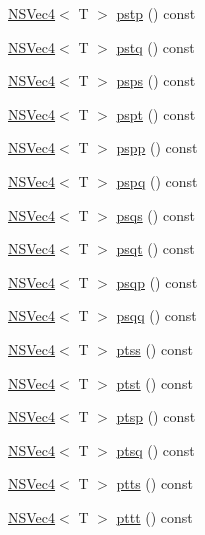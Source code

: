 \begin{DoxyCompactItemize}
\item 
\hyperlink{structNSVec4}{N\-S\-Vec4}$<$ T $>$ \hyperlink{structNSVec4_a2698a980bdd0f51541b2cf7fc70bcf73}{pstp} () const 
\item 
\hyperlink{structNSVec4}{N\-S\-Vec4}$<$ T $>$ \hyperlink{structNSVec4_a14bdfbfd269ca6f0bf85a7398a642324}{pstq} () const 
\item 
\hyperlink{structNSVec4}{N\-S\-Vec4}$<$ T $>$ \hyperlink{structNSVec4_add19de549cf8817c34ceac277e2e99ba}{psps} () const 
\item 
\hyperlink{structNSVec4}{N\-S\-Vec4}$<$ T $>$ \hyperlink{structNSVec4_af130d4783f5a2f97c95e58bdf30d685a}{pspt} () const 
\item 
\hyperlink{structNSVec4}{N\-S\-Vec4}$<$ T $>$ \hyperlink{structNSVec4_a39f177944247302e4107e51a2d885dda}{pspp} () const 
\item 
\hyperlink{structNSVec4}{N\-S\-Vec4}$<$ T $>$ \hyperlink{structNSVec4_a06bca7d4b0a3b90faffebdce43de3885}{pspq} () const 
\item 
\hyperlink{structNSVec4}{N\-S\-Vec4}$<$ T $>$ \hyperlink{structNSVec4_a3cb9d27366faf0e9e0325af8d4db5b0b}{psqs} () const 
\item 
\hyperlink{structNSVec4}{N\-S\-Vec4}$<$ T $>$ \hyperlink{structNSVec4_a8b303606e2937031e0bdfcfc5da4b752}{psqt} () const 
\item 
\hyperlink{structNSVec4}{N\-S\-Vec4}$<$ T $>$ \hyperlink{structNSVec4_aef09c71cec9777be13b3c1a3dd3e1448}{psqp} () const 
\item 
\hyperlink{structNSVec4}{N\-S\-Vec4}$<$ T $>$ \hyperlink{structNSVec4_a799c245268fa780b48a77eecf05656bb}{psqq} () const 
\item 
\hyperlink{structNSVec4}{N\-S\-Vec4}$<$ T $>$ \hyperlink{structNSVec4_a50448e8f167ea9d665618c501828316c}{ptss} () const 
\item 
\hyperlink{structNSVec4}{N\-S\-Vec4}$<$ T $>$ \hyperlink{structNSVec4_a4a3bb20ad6887827f883c0e559f5dd12}{ptst} () const 
\item 
\hyperlink{structNSVec4}{N\-S\-Vec4}$<$ T $>$ \hyperlink{structNSVec4_a0c705e22fe006e2563df35ef5221ce7b}{ptsp} () const 
\item 
\hyperlink{structNSVec4}{N\-S\-Vec4}$<$ T $>$ \hyperlink{structNSVec4_ac8f00966c8fe1c2062a33459cf1d593c}{ptsq} () const 
\item 
\hyperlink{structNSVec4}{N\-S\-Vec4}$<$ T $>$ \hyperlink{structNSVec4_a98741f0ad5ab51e3caf294ae817a4615}{ptts} () const 
\item 
\hyperlink{structNSVec4}{N\-S\-Vec4}$<$ T $>$ \hyperlink{structNSVec4_a47107867dc6488e83a014f2c5b9d889d}{pttt} () const 

\end{DoxyCompactItemize}
